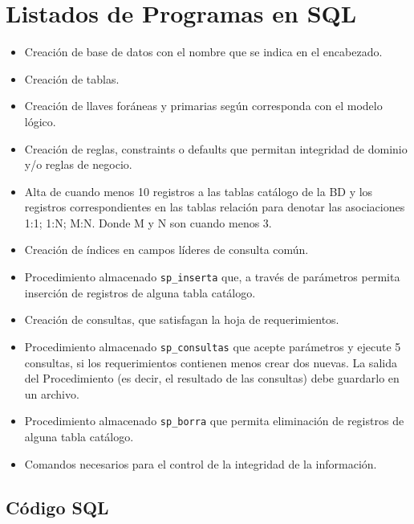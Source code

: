 \documentclass{article}
\begin{document}

\section*{Listados de Programas en SQL}

\begin{itemize}
    \item Creación de base de datos con el nombre que se indica en el encabezado.
    \item Creación de tablas.
    \item Creación de llaves foráneas y primarias según corresponda con el modelo lógico.
    \item Creación de reglas, constraints o defaults que permitan integridad de dominio y/o reglas de negocio.
    \item Alta de cuando menos 10 registros a las tablas catálogo de la BD y los registros correspondientes en las tablas relación para denotar las asociaciones 1:1; 1:N; M:N. Donde M y N son cuando menos 3.
    \item Creación de índices en campos líderes de consulta común.
    \item Procedimiento almacenado \texttt{sp\_inserta} que, a través de parámetros permita inserción de registros de alguna tabla catálogo.
    \item Creación de consultas, que satisfagan la hoja de requerimientos.
    \item Procedimiento almacenado \texttt{sp\_consultas} que acepte parámetros y ejecute 5 consultas, si los requerimientos contienen menos crear dos nuevas. La salida del Procedimiento (es decir, el resultado de las consultas) debe guardarlo en un archivo.
    \item Procedimiento almacenado \texttt{sp\_borra} que permita eliminación de registros de alguna tabla catálogo.
    \item Comandos necesarios para el control de la integridad de la información.
\end{itemize}

\subsection*{Código SQL}
\end{document}
